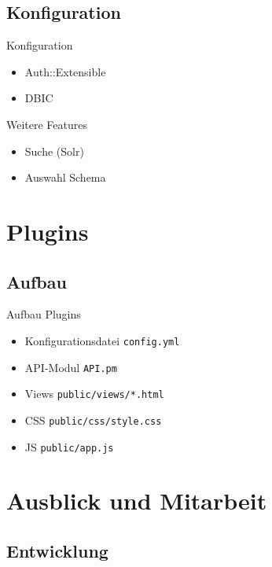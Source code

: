 \subsection{Konfiguration}
\begin{frame}{Konfiguration}
\begin{itemize}
\item Auth::Extensible
\item DBIC
\end{itemize}
\end{frame}

\begin{frame}{Weitere Features}
\begin{itemize}
\item Suche (Solr)
\item Auswahl Schema
\end{itemize}
\end{frame}

\section{Plugins}

\subsection{Aufbau}

\begin{frame}[fragile]{Aufbau Plugins}
\begin{itemize}
\item Konfigurationsdatei \verb|config.yml|
\item API-Modul \verb|API.pm|
\item Views \verb|public/views/*.html|
\item CSS \verb|public/css/style.css|
\item JS \verb|public/app.js|
\end{itemize}
\end{frame}

\section{Ausblick und Mitarbeit}

\subsection{Entwicklung}

